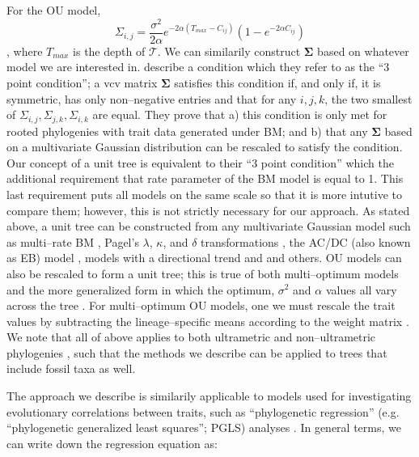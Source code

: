\documentclass[a4paper,12pt]{article}
\begin{document}
For the OU model, 
\begin{equation}
\Sigma_{i,j} = \frac{\sigma^2}{2\alpha} e^{-2\alpha (T_{max} - C_{ij})} (1 - e^{-2\alpha C_{ij}})
\end{equation}
\citep{Hansen1997, ButlerKing2004}, where $T_{max}$ is the depth of $\mathcal{T}$.
We can similarily construct $\mathbf{\Sigma}$ based on whatever model we are interested in. \citet{HoAne2013} describe a condition which they refer to as the ``3 point condition''; a vcv matrix $\mathbf{\Sigma}$ satisfies this condition if, and only if, it is symmetric, has only non--negative entries and that for any $i,j,k$, the two smallest of $\Sigma_{i,j}, \Sigma_{j,k}, \Sigma_{i,k}$ are equal. They prove that a) this condition is only met for rooted phylogenies with trait data generated under BM; and b) that any $\mathbf{\Sigma}$ based on a multivariate Gaussian distribution can be rescaled to satisfy the condition. Our concept of a unit tree is equivalent to their ``3 point condition'' which the additional requirement that rate parameter of the BM model is equal to 1. This last requirement puts all models on the same scale so that it is more intutive to compare them; however, this is not strictly necessary for our approach. As stated above, a unit tree can be constructed from any multivariate Gaussian model such as multi--rate BM \citep{Omeara2006, Thomas2006, Eastman2011, Revell2012}, Pagel's $\lambda$, $\kappa$, and $\delta$ transformations \citep{Pagel1997, Pagel1999}, the AC/DC (also known as EB) model \citep{Blomberg2003, Harmon2010}, models with a directional trend \citep{Hunt2007} and and others. OU models can also be rescaled to form a unit tree; this is true of both multi--optimum \citep{ButlerKing2004} models and the more generalized form \citep{Beaulieu2012} in which the optimum, $\sigma^2$ and $\alpha$ values all vary across the tree \citep{HoAne2013}. For multi--optimum OU models, one we must rescale the trait values by subtracting the lineage--specific means according to the weight matrix \citep[see][]{Hansen1997, ButlerKing2004, Beaulieu2012}. We note that all of above applies to both ultrametric and non--ultrametric phylogenies \citep{HoAne2013}, such that the methods we describe can be applied to trees that include fossil taxa as well.

The approach we describe is similarily applicable to models used for investigating evolutionary correlations between traits, such as ``phylogenetic regression'' (e.g. ``phylogenetic generalized least squares''; PGLS) analyses \citep{Grafen1989, Rohlf2001}. In general terms, we can write down the regression equation as:
\end{document}
